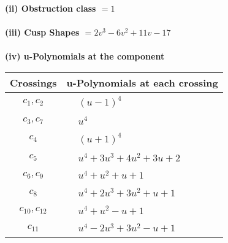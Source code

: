 \documentclass[1p]{elsarticle_modified}
\theoremstyle{definition}
\begin{document}
\flushleft \textbf{(ii) Obstruction class $= 1$}\\~\\
\flushleft \textbf{(iii) Cusp Shapes $= 2 v^3-6 v^2+11 v-17$}\\~\\
\newpage\renewcommand{\arraystretch}{1}
\flushleft \textbf{(iv) u-Polynomials at the component}\newline \\
\begin{tabular}{m{50pt}|m{274pt}}
Crossings & \hspace{64pt}u-Polynomials at each crossing \\
\hline $$\begin{aligned}c_{1},c_{2}\end{aligned}$$&$\begin{aligned}
&(u-1)^4
\end{aligned}$\\
\hline $$\begin{aligned}c_{3},c_{7}\end{aligned}$$&$\begin{aligned}
&u^4
\end{aligned}$\\
\hline $$\begin{aligned}c_{4}\end{aligned}$$&$\begin{aligned}
&(u+1)^4
\end{aligned}$\\
\hline $$\begin{aligned}c_{5}\end{aligned}$$&$\begin{aligned}
&u^4+3 u^3+4 u^2+3 u+2
\end{aligned}$\\
\hline $$\begin{aligned}c_{6},c_{9}\end{aligned}$$&$\begin{aligned}
&u^4+u^2+u+1
\end{aligned}$\\
\hline $$\begin{aligned}c_{8}\end{aligned}$$&$\begin{aligned}
&u^4+2 u^3+3 u^2+u+1
\end{aligned}$\\
\hline $$\begin{aligned}c_{10},c_{12}\end{aligned}$$&$\begin{aligned}
&u^4+u^2- u+1
\end{aligned}$\\
\hline $$\begin{aligned}c_{11}\end{aligned}$$&$\begin{aligned}
&u^4-2 u^3+3 u^2- u+1
\end{aligned}$\\
\hline
\end{tabular}\\~\\
\end{document}
